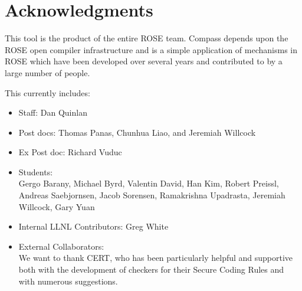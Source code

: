 \section*{Acknowledgments}

   This tool is the product of the entire ROSE team. Compass
depends upon the ROSE open compiler infrastructure and is a
simple application of mechanisms in ROSE which have been 
developed over several years and contributed to by a large 
number of people.

This currently includes:

\begin{itemize}
   \item Staff: Dan Quinlan
   \item Post docs: Thomas Panas, Chunhua Liao, and Jeremiah Willcock
   \item Ex Post doc: Richard Vuduc 
   \item Students: \\
         Gergo Barany, Michael Byrd, Valentin David, Han Kim, Robert Preissl,
         Andreas Saebjornsen, Jacob Sorensen, Ramakrishna Upadrasta, 
         Jeremiah Willcock, Gary Yuan
   \item Internal LLNL Contributors: Greg White
   \item External Collaborators: \\ 
         We want to thank CERT, who has been particularly helpful and supportive both
         with the development of checkers for their Secure Coding Rules and with 
         numerous suggestions.
\end{itemize}


